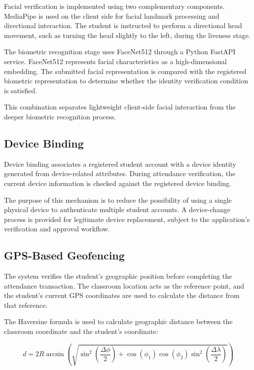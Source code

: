 \documentclass[conference]{IEEEtran}
\begin{document}
Facial verification is implemented using two complementary components. MediaPipe is used on the client side for facial landmark processing and directional interaction. The student is instructed to perform a directional head movement, such as turning the head slightly to the left, during the liveness stage.

The biometric recognition stage uses FaceNet512 through a Python FastAPI service. FaceNet512 represents facial characteristics as a high-dimensional embedding. The submitted facial representation is compared with the registered biometric representation to determine whether the identity verification condition is satisfied.

This combination separates lightweight client-side facial interaction from the deeper biometric recognition process.


\subsection{Device Binding}

Device binding associates a registered student account with a device identity generated from device-related attributes. During attendance verification, the current device information is checked against the registered device binding.

The purpose of this mechanism is to reduce the possibility of using a single physical device to authenticate multiple student accounts. A device-change process is provided for legitimate device replacement, subject to the application's verification and approval workflow.


\subsection{GPS-Based Geofencing}

The system verifies the student's geographic position before completing the attendance transaction. The classroom location acts as the reference point, and the student's current GPS coordinates are used to calculate the distance from that reference.

The Haversine formula is used to calculate geographic distance between the classroom coordinate and the student's coordinate:

\begin{equation}
d = 2R\arcsin
\left(
\sqrt{
\sin^2\left(\frac{\Delta\phi}{2}\right)
+
\cos(\phi_1)\cos(\phi_2)
\sin^2\left(\frac{\Delta\lambda}{2}\right)
}
\right)
\end{equation}
\end{document}
